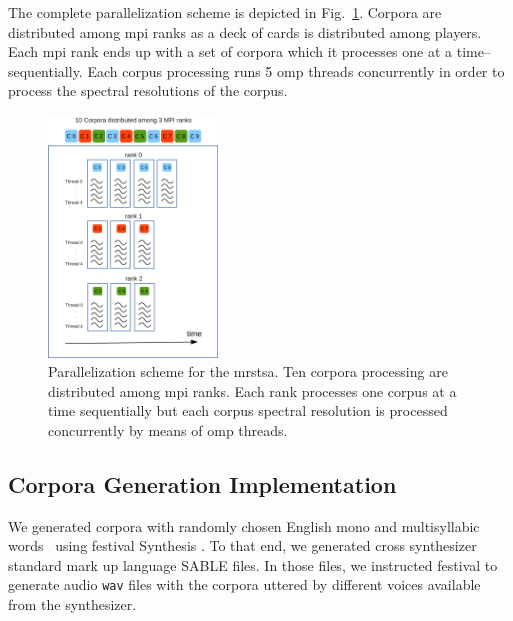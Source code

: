 \documentclass[10pt,journal,compsoc]{IEEEtran}
\begin{document}
The complete parallelization scheme is depicted in Fig.~\ref{fig:MRSTSA_Parallelization}. Corpora are distributed among \gls{mpi} ranks as a deck of cards is distributed among players. Each \gls{mpi} rank ends up with a set of corpora which it processes one at a time--sequentially. Each corpus processing runs 5 \gls{omp} threads concurrently in order to process the spectral resolutions of the corpus. 

\begin{figure}[h!]
    \centering
    \includegraphics[width=0.4\textwidth]{MRSTSA_Parallelization.png}
    \caption{Parallelization scheme for the \gls{mrstsa}. Ten corpora processing are distributed among \gls{mpi} ranks. Each rank processes one corpus at a time sequentially but each corpus spectral resolution is processed concurrently by means of \gls{omp} threads.}
    \label{fig:MRSTSA_Parallelization}
\end{figure}















\subsection{Corpora Generation Implementation}
\label{CorpGenImp}

We generated corpora with randomly chosen English mono and multisyllabic words~\cite{Dematties2018} using \gls{festival} Synthesis \cite{festival2014}. To that end, we generated cross synthesizer standard mark up language SABLE \cite{sable} files. In those files, we instructed \gls{festival} to generate audio \texttt{wav} files with the corpora uttered by different voices available from the synthesizer.
\end{document}
